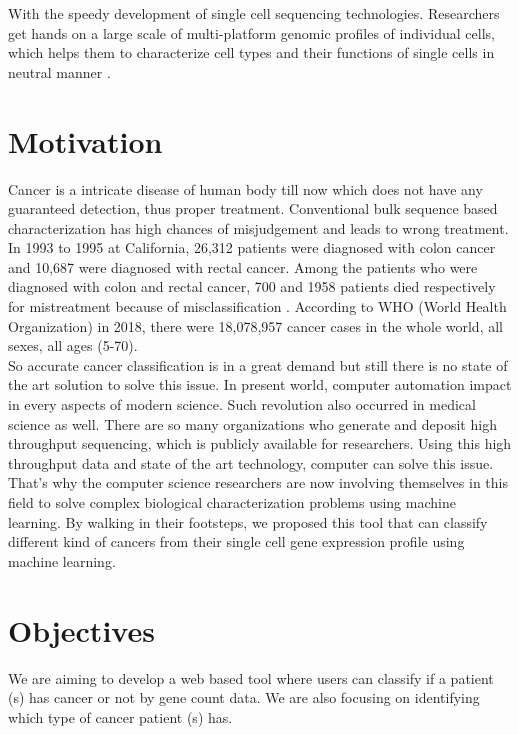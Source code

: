 With the speedy development of single cell sequencing technologies. Researchers get hands on a large scale of multi-platform genomic profiles of individual cells, which helps them to characterize cell types and their functions of single cells in neutral manner \cite{10.1093/bib/bbz096}. 

\section{Motivation}
\label{motiv}
Cancer is a intricate disease of human body till now which does not have any guaranteed detection, thus proper treatment. Conventional bulk sequence based characterization has high chances of misjudgement and leads to wrong treatment. In 1993 to 1995 at California, 26,312 patients were diagnosed with colon cancer and 10,687 were diagnosed with rectal cancer. Among the patients who were diagnosed with colon and rectal cancer, 700 and 1958 patients died respectively for mistreatment because of misclassification \cite{10.1093/jnci/djr207}. According to WHO (World Health Organization) in 2018, there were 18,078,957 cancer cases in the whole world, all sexes, all ages (5-70).\\[10pt] 
So accurate cancer classification is in a great demand but still there is no state of the art solution to solve this issue. In present world, computer automation impact in every aspects of modern science. Such revolution also occurred in medical science as well. There are so many organizations who generate and deposit high throughput sequencing, which is publicly available for researchers. Using this high throughput data and state of the art technology, computer can solve this issue. That's why the computer science researchers are now involving themselves in this field to solve complex biological characterization problems using machine learning. By walking in their footsteps, we proposed this tool that can classify different kind of cancers from their single cell gene expression profile using machine learning.          
\section{Objectives}
\label{obj}
We are aiming to develop a web based tool where users can classify if a patient (s) has cancer or not by gene count data. We are also focusing on identifying which type of cancer patient (s) has. 
